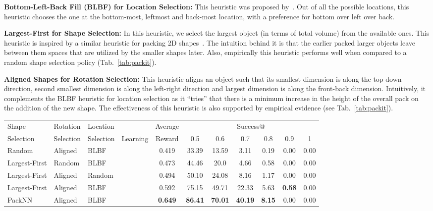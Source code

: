 \documentclass{article}
\begin{document}
\noindent\textbf{Bottom-Left-Back Fill (BLBF) for Location Selection: }This heuristic was proposed by~\cite{tiwari2010fast}. Out of all the possible locations, this heuristic chooses the one at the bottom-most, leftmost and back-most location, with a preference for bottom over left over back.

\noindent\textbf{Largest-First for Shape Selection: }In this heuristic, we select the largest object (in terms of total volume) from the available ones. This heuristic is inspired by a similar heuristic for packing 2D shapes~\cite{chen2003two}. The intuition behind it is that the earlier packed larger objects leave between them spaces that are utilized by the smaller shapes later. Also, empirically this heuristic performs well when compared to a random shape selection policy (Tab.~\ref{tab:packit}).

\noindent\textbf{Aligned Shapes for Rotation Selection: }This heuristic aligns an object such that its smallest dimension is along the top-down direction, second smallest dimension is along the left-right direction and largest dimension is along the front-back dimension. Intuitively, it complements the BLBF heuristic for location selection as it ``tries'' that there is a minimum increase in the height of the overall pack on the addition of the new shape. The effectiveness of this heuristic is also supported by empirical evidence (see Tab.~\ref{tab:packit}).
\begin{table*}[t]
    \centering
    \begin{center}
    \begin{tabular}{lll|c||c|cccccc}
    \hline
    Shape  & Rotation  & Location & & Average & \multicolumn{6}{c}{Success@}  \\
     Selection & Selection & Selection & Learning & Reward & 0.5 & 0.6 & 0.7 & 0.8 & 0.9 & 1\\
     \hline \hline
     Random        & Aligned & BLBF &    & 0.419 & 33.39 & 13.59 & 3.11  & 0.19 & 0.00 & 0.00 \\
     Largest-First & Random  & BLBF &    & 0.473 & 44.46 & 20.0  & 4.66  & 0.58 & 0.00 & 0.00 \\
      Largest-First & Aligned & Random &  & 0.494 & 50.10 & 24.08 & 8.16  & 1.17 & 0.00 & 0.00 \\
     Largest-First & Aligned & BLBF &    & 0.592 & 75.15 & 49.71 & 22.33 & 5.63 & \textbf{0.58} & 0.00 \\
     PackNN        & Aligned & BLBF &     & \textbf{0.649}  & \textbf{86.41}  & \textbf{70.01}  & \textbf{40.19}  & \textbf{8.15} & 0.00 & 0.00 \\
    \hline
    \end{tabular}
    \end{center}
    \caption{Performance of various model-free baselines on the PackIt environment. Leaning-based model outperforms a heuristic-based one indicating learning could be a viable option to acquire geometric planning skills for packing.}
    \label{tab:packit}
\end{table*}
\end{document}
